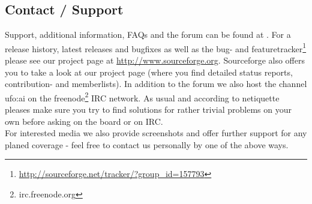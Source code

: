 \subsection{Contact / Support}
Support, additional information, FAQs and the forum can be found at \ufohomepage.
For a release history, latest releases and bugfixes as well as the bug- and featuretracker\footnote{\url{http://sourceforge.net/tracker/?group_id=157793}} please see our project page at \url{http://www.sourceforge.org}.
Sourceforge also offers you to take a look at our project page (where you find detailed status reports, contribution- and memberlists). In addition to the forum we also host the channel ufo:ai on the freenode\footnote{irc.freenode.org} IRC network. As usual and according to netiquette pleases make sure you try to find solutions for rather trivial problems on your own before asking on the board or on IRC.\\
For interested media we also provide screenshots and offer further support for any planed coverage - feel free to contact us personally by one of the above ways.
